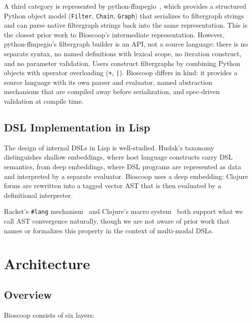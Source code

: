 \documentclass[english,submission]{programming}
\begin{document}
A third category is represented by python-ffmpegio~\cite{ffmpegio}, which provides a structured Python object model (\texttt{Filter}, \texttt{Chain}, \texttt{Graph}) that serializes to filtergraph strings and can parse native filtergraph strings back into the same representation. This is the closest prior work to Bioscoop's intermediate representation. However, python-ffmpegio's filtergraph builder is an API, not a source language: there is no separate syntax, no named definitions with lexical scope, no iteration construct, and no parameter validation. Users construct filtergraphs by combining Python objects with operator overloading (\texttt{+}, \texttt{|}). Bioscoop differs in kind: it provides a source language with its own parser and evaluator, named abstraction mechanisms that are compiled away before serialization, and spec-driven validation at compile time.

\subsection{DSL Implementation in Lisp}

The design of internal DSLs in Lisp is well-studied. Hudak's taxonomy~\cite{hudak} distinguishes shallow embeddings, where host language constructs carry DSL semantics, from deep embeddings, where DSL programs are represented as data and interpreted by a separate evaluator. Bioscoop uses a deep embedding: Clojure forms are rewritten into a tagged vector AST that is then evaluated by a definitional interpreter.

Racket's \texttt{\#lang} mechanism~\cite{racket} and Clojure's macro system~\cite{clojure} both support what we call AST convergence naturally, though we are not aware of prior work that names or formalizes this property in the context of multi-modal DSLs.

\section{Architecture}

\subsection{Overview}

Bioscoop consists of six layers:
\end{document}
